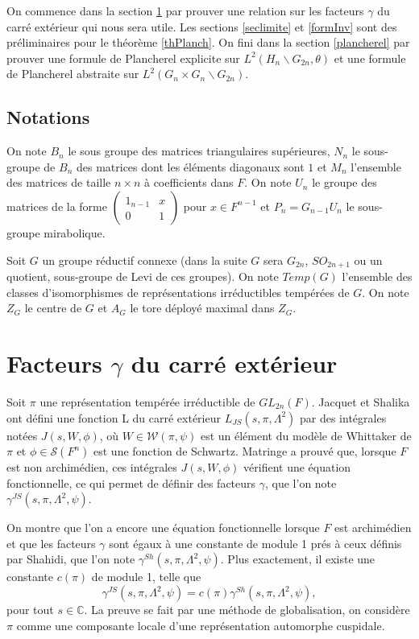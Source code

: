 \documentclass{amsart}
\begin{document}
On commence dans la section \ref{gamma} par prouver une relation sur les facteurs $\gamma$ du carré extérieur qui nous sera utile. Les sections \ref{seclimite} et \ref{formInv} sont des préliminaires pour le théorème \ref{thPlanch}. On fini dans la section \ref{plancherel} par prouver une formule de Plancherel explicite sur $L^2(H_n \backslash G_{2n}, \theta)$ et une formule de Plancherel abstraite sur $L^2(G_n \times G_n \backslash G_{2n})$.
\subsection{Notations}
On note $B_n$ le sous groupe des matrices triangulaires supérieures, $N_n$ le sous-groupe de $B_n$ des matrices dont les éléments diagonaux sont $1$ et $M_n$ l'ensemble des matrices de taille $n \times n$ à coefficients dans $F$. On note $U_n$ le groupe des matrices de la forme $\begin{pmatrix}
1_{n-1} & x \\
0 & 1
\end{pmatrix}$ pour $x \in F^{n-1}$ et $P_n = G_{n-1}U_n$ le sous-groupe mirabolique.

Soit $G$ un groupe réductif connexe (dans la suite $G$ sera $G_{2n}$, $SO_{2n+1}$ ou un quotient, sous-groupe de Levi de ces groupes). On note $Temp(G)$ l'ensemble des classes d'isomorphismes de représentations irréductibles tempérées de $G$. On note $Z_G$ le centre de $G$ et $A_G$ le tore déployé maximal dans $Z_G$.

\section{Facteurs $\gamma$ du carré extérieur}
\label{gamma}
Soit $\pi$ une représentation tempérée irréductible de $GL_{2n}(F)$. Jacquet et Shalika ont défini une fonction L du carré extérieur $L_{JS}(s, \pi, \Lambda^2)$ par des intégrales notées $J(s, W, \phi)$, où $W \in \mathcal{W}(\pi, \psi)$ est un élément du modèle de Whittaker de $\pi$ et $\phi \in \mathcal{S}(F^n)$ est une fonction de Schwartz. Matringe a prouvé que, lorsque $F$ est non archimédien, ces intégrales $J(s,W,\phi)$ vérifient une équation fonctionnelle, ce qui permet de définir des facteurs $\gamma$, que l'on note $\gamma^{JS}(s,\pi,\Lambda^2,\psi)$. 

On montre que l'on a encore une équation fonctionnelle lorsque $F$ est archimédien et que les facteurs $\gamma$ sont égaux à une constante de module 1 prés à ceux définis par Shahidi, que l'on note $\gamma^{Sh}(s,\pi,\Lambda^2,\psi)$. Plus exactement, il existe une constante $c(\pi)$ de module 1, telle que
\begin{equation}
\gamma^{JS}(s,\pi,\Lambda^2,\psi)=c(\pi)\gamma^{Sh}(s,\pi,\Lambda^2,\psi),
\end{equation}
pour tout $s \in \mathbb{C}$. La preuve se fait par une méthode de globalisation, on considère $\pi$ comme une composante locale d'une représentation automorphe cuspidale.
\end{document}

